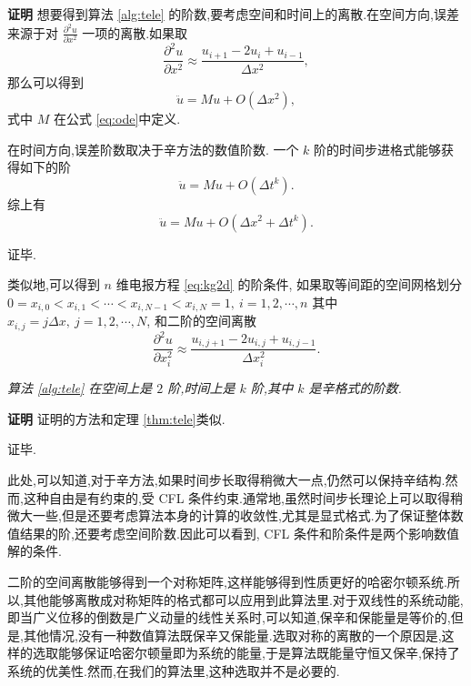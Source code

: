 {\textbf{证明}} 想要得到算法 \ref{alg:tele} 的阶数,要考虑空间和时间上的离散.在空间方向,误差来源于对 $\frac{\partial^2
u}{\partial x^2}$ 一项的离散.如果取
\begin{equation*}
\frac{\partial^2u}{\partial x^2}\approx \frac{u_{i+1}-2u_i+u_{i-1}}{\Delta x^2},
\end{equation*}
那么可以得到
\begin{equation*}
\ddot{u}=Mu+O(\Delta x^2),
\end{equation*}
式中 $M$ 在公式 \eqref{eq:ode}中定义.

在时间方向,误差阶数取决于辛方法的数值阶数. 一个 $k$ 阶的时间步进格式能够获得如下的阶
\begin{equation*}
\ddot{u}=Mu+O(\Delta t^k).
\end{equation*}
综上有
\begin{equation*}
\ddot{u}=Mu+O(\Delta x^2+ \Delta t^k).
\end{equation*}

证毕.

类似地,可以得到 $n$ 维电报方程 \eqref{eq:kg2d} 的阶条件, 如果取等间距的空间网格划分
$0=x_{i,0}<x_{i,1}<\cdots<x_{i,N-1}<x_{i,N}=1,~i=1,2,\cdots,n$ 其中
$x_{i,j}=j\Delta x,~j = 1,2,\cdots,N$, 和二阶的空间离散
\begin{equation*}
\frac{\partial^2u}{\partial x_i^2}\approx \frac{u_{i,j+1}-2u_{i,j}+u_{i,j-1}}{\Delta x_i^2}.
\end{equation*}

\begin{theorem}
\emph{算法 \ref{alg:tele} 在空间上是 $2$ 阶,时间上是 $k$ 阶,其中 $k$ 是辛格式的阶数.}
\end{theorem}

{\textbf{证明}} 证明的方法和定理 \ref{thm:tele}类似.

证毕.

此处,可以知道,对于辛方法,如果时间步长取得稍微大一点,仍然可以保持辛结构.然而,这种自由是有约束的,受 CFL 条件约束.通常地,虽然时间步长理论上可以取得稍微大一些,但是还要考虑算法本身的计算的收敛性,尤其是显式格式.为了保证整体数值结果的阶,还要考虑空间阶数.因此可以看到, CFL 条件和阶条件是两个影响数值解的条件.

二阶的空间离散能够得到一个对称矩阵,这样能够得到性质更好的哈密尔顿系统.所以,其他能够离散成对称矩阵的格式都可以应用到此算法里.对于双线性的系统动能,即当广义位移的倒数是广义动量的线性关系时,可以知道,保辛和保能量是等价的,但是,其他情况,没有一种数值算法既保辛又保能量.选取对称的离散的一个原因是,这样的选取能够保证哈密尔顿量即为系统的能量,于是算法既能量守恒又保辛,保持了系统的优美性.然而,在我们的算法里,这种选取并不是必要的.

